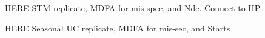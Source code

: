 \documentclass[a4paper]{book}
\begin{document}





% 

 




HERE  STM replicate, MDFA for mis-spec, and Ndc.  Connect to HP
 

HERE  Seasonal UC replicate, MDFA for mis-sec, and Starts
\end{document}
